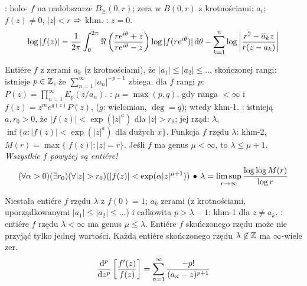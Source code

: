 :  holo- $f$ na nadobszarze $B_\ge (0, r)$; zera w $B(0,r)$ z krotnościami: $a_i$; $f(z) \neq 0$, $|z| < r$ $\Rightarrow$ khm.
: $z = 0$.
\[
	\log |f(z)| = \frac{1}{2\pi} \int_0^{2 \pi} \Re \left(\frac{re^{i \theta} + z}{re^{i \theta}-z}\right) \log|f(re^{i \theta})| \,\textrm{d} \theta - \sum_{k=1}^n \log \left| \frac{r^2 - \overline{a}_k z}{r(z-a_k)} \right|
\]

Entiére  $f$ z zerami $a_k$ (z krotnościami), że $|a_1| \le |a_2| \le \dots$ {skończonej rangi}: istnieje $p \in \mathbb{Z}$, że $\sum_{n=1}^\infty {|a_n|^{-p-1}}$ zbiega.
 dla $f$ {rangi} $p$: $P(z) = \prod_{n=1}^\infty E_p(z/a_n)$.
: $\mu = \max(p,q)$, gdy ranga $< \infty$ i $f(z) = z^m e^{g(z)} P(z)$, ($g$: wielomian, $\deg = q$); wtedy khm-1.
: istnieją $a, r_0 > 0$, że $|f(z)| < \exp(|z|^a)$ dla $|z| > r_0$; jej rząd: $\lambda$, $\inf\{a : |f(z)| < \exp(|z|^a) \text{ dla dużych } x\}$.
Funkcja $f$ rzędu $\lambda$: khm-2, $M(r) = \max \{|f(z)| : |z| = r\}$.
Jeśli $f$ ma genus $\mu < \infty$, to $\lambda \le \mu +1$.
\emph{Wszystkie $f$ powyżej są entiére!}
\[
	(\forall \alpha > 0)(\exists r_0)(\forall |z| > r_0)(|f(z)| < \exp(\alpha |z|^{\mu + 1})) \, \bullet \,
	\lambda = \limsup_{r \to \infty} \frac{\log \log M(r)}{\log r}
\]

Niestała  entiére $f$ rzędu $\lambda$ z $f(0) = 1$; $a_k$ zerami (z krotnościami, uporządkowanymi $|a_1| \le |a_2| \le \dots$) i całkowita $p > \lambda - 1$: khm-1 dla $z \neq a_k$.
: entiére $f$ rzędu $\lambda < \infty$ ma {genus} $\mu \le \lambda$.
Entiére $f$ skończonego rzędu może nie przyjąć tylko jednej wartości.
Każda entiére skończonego rzędu $\lambda \not\in \mathbb{Z}$ ma $\infty$-wiele zer.
\[
	\frac{\textrm{d}{}^p}{\textrm{d}{z}^p} \left [\frac{f'(z)}{f(z)} \right] = \sum_{n=1}^\infty \frac{-p!}{(a_n-z)^{p+1}}
\]


